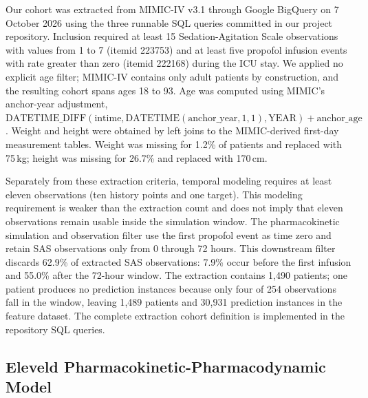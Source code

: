 \documentclass[11pt,a4paper]{article}
\begin{document}
Our cohort was extracted from MIMIC-IV v3.1 through Google BigQuery on 7 October 2026 using the three runnable SQL queries committed in our project repository. Inclusion required at least 15 Sedation-Agitation Scale observations with values from 1 to 7 (itemid 223753) and at least five propofol infusion events with rate greater than zero (itemid 222168) during the ICU stay. We applied no explicit age filter; MIMIC-IV contains only adult patients by construction, and the resulting cohort spans ages 18 to 93. Age was computed using MIMIC's anchor-year adjustment, $\mathrm{DATETIME\_DIFF}(\mathrm{intime}, \mathrm{DATETIME}(\mathrm{anchor\_year},1,1),\mathrm{YEAR})+\mathrm{anchor\_age}$. Weight and height were obtained by left joins to the MIMIC-derived first-day measurement tables. Weight was missing for 1.2\% of patients and replaced with 75\,kg; height was missing for 26.7\% and replaced with 170\,cm.

Separately from these extraction criteria, temporal modeling requires at least eleven observations (ten history points and one target). This modeling requirement is weaker than the extraction count and does not imply that eleven observations remain usable inside the simulation window. The pharmacokinetic simulation and observation filter use the first propofol event as time zero and retain SAS observations only from 0 through 72 hours. This downstream filter discards 62.9\% of extracted SAS observations: 7.9\% occur before the first infusion and 55.0\% after the 72-hour window. The extraction contains 1,490 patients; one patient produces no prediction instances because only four of 254 observations fall in the window, leaving 1,489 patients and 30,931 prediction instances in the feature dataset. The complete extraction cohort definition is implemented in the repository SQL queries.

\subsection{Eleveld Pharmacokinetic-Pharmacodynamic Model}
\end{document}
